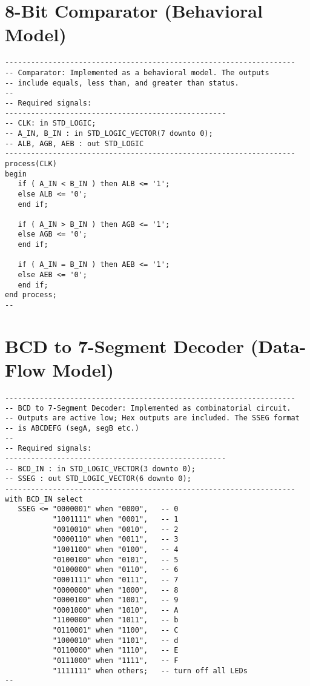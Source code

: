 \section{8-Bit Comparator (Behavioral Model)}
\noindent
\begin{minipage}{1\linewidth}
\begin{lstlisting}
-------------------------------------------------------------------
-- Comparator: Implemented as a behavioral model. The outputs 
-- include equals, less than, and greater than status.  
-- 
-- Required signals: 
---------------------------------------------------
-- CLK: in STD_LOGIC;
-- A_IN, B_IN : in STD_LOGIC_VECTOR(7 downto 0);
-- ALB, AGB, AEB : out STD_LOGIC
-------------------------------------------------------------------
process(CLK)
begin
   if ( A_IN < B_IN ) then ALB <= '1';
   else ALB <= '0';
   end if;
    
   if ( A_IN > B_IN ) then AGB <= '1';
   else AGB <= '0';
   end if;
    
   if ( A_IN = B_IN ) then AEB <= '1';
   else AEB <= '0';
   end if;    
end process;
--
\end{lstlisting}
\end{minipage}

\section{BCD to 7-Segment Decoder (Data-Flow Model)}
\noindent
\begin{minipage}{1\linewidth}
\begin{lstlisting}
-------------------------------------------------------------------
-- BCD to 7-Segment Decoder: Implemented as combinatorial circuit.  
-- Outputs are active low; Hex outputs are included. The SSEG format
-- is ABCDEFG (segA, segB etc.)
--
-- Required signals: 
---------------------------------------------------
-- BCD_IN : in STD_LOGIC_VECTOR(3 downto 0);
-- SSEG : out STD_LOGIC_VECTOR(6 downto 0); 
-------------------------------------------------------------------   
with BCD_IN select
   SSEG <= "0000001" when "0000",   -- 0
           "1001111" when "0001",   -- 1
           "0010010" when "0010",   -- 2
           "0000110" when "0011",   -- 3
           "1001100" when "0100",   -- 4
           "0100100" when "0101",   -- 5
           "0100000" when "0110",   -- 6
           "0001111" when "0111",   -- 7
           "0000000" when "1000",   -- 8
           "0000100" when "1001",   -- 9
           "0001000" when "1010",   -- A
           "1100000" when "1011",   -- b
           "0110001" when "1100",   -- C
           "1000010" when "1101",   -- d
           "0110000" when "1110",   -- E
           "0111000" when "1111",   -- F
           "1111111" when others;   -- turn off all LEDs
--
\end{lstlisting}
\end{minipage}

